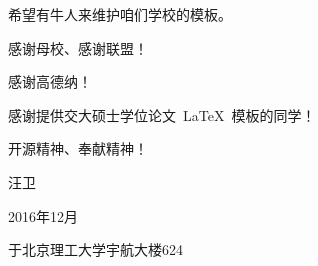 
\begin{thanks}

  {\color{red} 希望有牛人来维护咱们学校的模板。}

  感谢母校、感谢联盟！

  感谢高德纳！

  感谢提供交大硕士学位论文~\LaTeX~模板的同学！

  开源精神、奉献精神！

  \vskip 20mm
 {
  \hspace{80mm} {汪卫}

  \hspace{80mm} {2016年12月}

  \hspace{80mm} {于北京理工大学宇航大楼624} }
\end{thanks}
